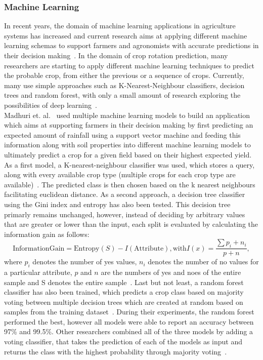 \documentclass{Academic}
\begin{document}
    \subsubsection{Machine Learning} %
    In recent years, the domain of machine learning applications in agriculture systems has increased and current research aims at applying different machine learning schemas to support farmers and agronomists with accurate predictions in their decision making~\cite{rao_crop_2022, dupuis_performances_2023}. In the domain of crop rotation prediction, many researchers are starting to apply different machine learning techniques to predict the probable crop, from either the previous or a sequence of crops. Currently, many use simple approaches such as K-Nearest-Neighbour classifiers, decision trees and random forest, with only a small amount of research exploring the possibilities of deep learning~\cite{pragathi_crop_nodate, rao_crop_2022, dupuis_performances_2023}.\\
    Madhuri et. al.~\cite{rao_crop_2022} used multiple machine learning models to build an application which aims at supporting farmers in their decision making by first predicting an expected amount of rainfall using a support vector machine and feeding this information along with soil properties into different machine learning models to ultimately predict a crop for a given field based on their highest expected yield. As a first model, a K-nearest-neighbour classifier was used, which stores a query, along with every available crop type (multiple crops for each crop type are available)~\cite{rao_crop_2022}. The predicted class is then chosen based on the k nearest neighbours facilitating euclidean distance. As a second approach, a decision tree classifier using the Gini index and entropy has also been tested. This decision tree primarly remains unchanged, however, instead of deciding by arbitrary values that are greater or lower than the input, each split is evaluated by calculating the information gain as follows:
    \[\mathrm{Information Gain} = \mathrm{Entropy}(S) - I(\mathrm{Attribute}), \mathrm{ with } I(x) = \frac{\sum p_i + n_i}{p + n},\]
    where $p_i$ denotes the number of yes values, $n_i$ denotes the number of no values for a particular attribute, $p$ and $n$ are the numbers of yes and noes of the entire sample and S denotes the entire sample~\cite{rao_crop_2022}. Last but not least, a random forest classifier has also been trained, which predicts a crop class based on majority voting between multiple decision trees which are created at random based on samples from the training dataset~\cite{rao_crop_2022}. During their experiments, the random forest performed the best, however all models were able to report an accuracy between 97\% and 99.5\%. Other researchers combined all of the three models by adding a voting classifier, that takes the prediction of each of the models as input and returns the class with the highest probability through majority voting~\cite{pragathi_crop_nodate}.
\end{document}
